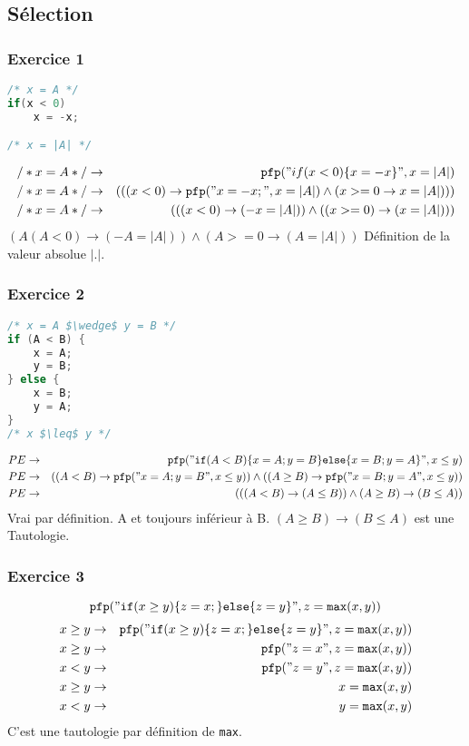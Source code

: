	\subsection{Sélection} \label{pfpSequence}
	\subsubsection{Exercice 1}
\begin{lstlisting}[language=C]
/* x = A */
if(x < 0)
	x = -x;

/* x = |A| */
\end{lstlisting}

\begin{eqnarray*}
	/*x = A*/ &\rightarrow& \pfp ("if(x < 0)\{ x = -x \}", x = |A|)\\
	/*x = A*/ &\rightarrow& (((x<0)\rightarrow \pfp ("x=-x;", x = |A| ) \wedge (x >= 0 \rightarrow x = |A|)))\\
	/*x = A*/ &\rightarrow& (((x < 0) \rightarrow (-x = |A|)) \wedge (( x >= 0) \rightarrow (x = |A|)))\\
\end{eqnarray*}
$( A ( A < 0) \rightarrow (-A = |A|) ) \wedge (A >= 0 \rightarrow (A=|A|))$
Définition de la valeur absolue $|.|$.

\subsubsection{Exercice 2}
\begin{lstlisting}[language=C]
/* x = A $\wedge$ y = B */
if (A < B) {
	x = A;
	y = B;
} else {
	x = B;
	y = A;
}
/* x $\leq$ y */ 
\end{lstlisting}
\begin{eqnarray*}
	PE &\rightarrow& \pfp ("\ifp (A < B) \{ x = A; y = B\}\elsep \{ x = B; y =A\}", x \leq y)\\
PE&\rightarrow&((A<B)\rightarrow\pfp("x=A;y=B",x\leq y))\wedge((A\geq B)\rightarrow\pfp("x=B;y=A",x\leq y))\\
	PE &\rightarrow& ((( A < B) \rightarrow (A \leq B)) \wedge (A \geq B ) \rightarrow (B \leq A))
\end{eqnarray*}
Vrai par définition. A et toujours inférieur à B. $(A \geq B) \rightarrow (B \leq A)$ est une Tautologie. 
\subsubsection{Exercice 3}
$$\pfp ("\ifp (x \geq y )\{z=x;\}\elsep\{z=y\}",z=\texttt{max}(x,y))$$
\begin{eqnarray*}
x \geq y  &\rightarrow&	\pfp ("\ifp (x \geq y )\{z=x;\}\elsep\{z=y\}",z=\texttt{max}(x,y))\\
x \geq y &\rightarrow& \pfp ("z = x", z = \texttt{max}(x,y))\\
x < y &\rightarrow& \pfp ("z = y", z = \texttt{max}(x,y))\\
x \geq y &\rightarrow& x = \texttt{max}(x,y)\\
x < y &\rightarrow& y = \texttt{max}(x,y)
\end{eqnarray*}
C'est une tautologie par définition de \texttt{max}.

